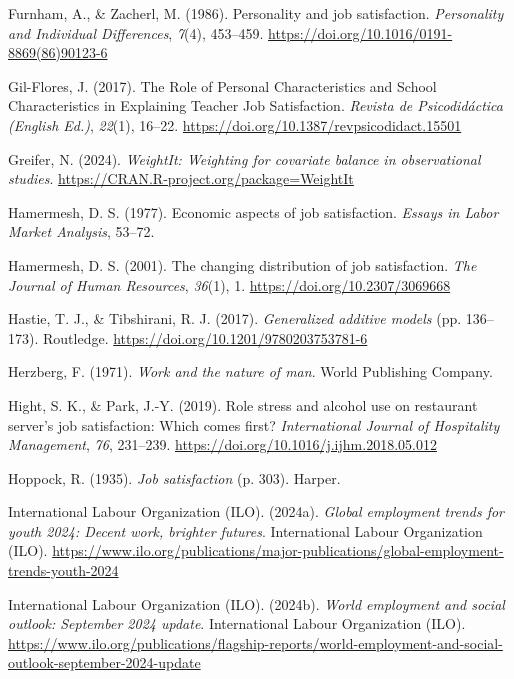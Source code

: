 \documentclass[
]{interact}
\newlength{\cslhangindent}
\newenvironment{CSLReferences}[2] %
 {\begin{list}{}{%
  \setlength{\itemindent}{0pt}
  \setlength{\leftmargin}{0pt}
  \setlength{\parsep}{0pt}
  \ifodd #1
   \setlength{\leftmargin}{\cslhangindent}
   \setlength{\itemindent}{-1\cslhangindent}
  \fi
  \setlength{\itemsep}{#2\baselineskip}}}
 {\end{list}}
\begin{document}
\begin{CSLReferences}{1}{0}
Furnham, A., \& Zacherl, M. (1986). Personality and job satisfaction.
\emph{Personality and Individual Differences}, \emph{7}(4), 453--459.
\url{https://doi.org/10.1016/0191-8869(86)90123-6}

Gil-Flores, J. (2017). The Role of Personal Characteristics and School
Characteristics in Explaining Teacher Job Satisfaction. \emph{Revista de
Psicodidáctica (English Ed.)}, \emph{22}(1), 16--22.
\url{https://doi.org/10.1387/revpsicodidact.15501}

Greifer, N. (2024). \emph{WeightIt: Weighting for covariate balance in
observational studies}.
\url{https://CRAN.R-project.org/package=WeightIt}

Hamermesh, D. S. (1977). Economic aspects of job satisfaction.
\emph{Essays in Labor Market Analysis}, 53--72.

Hamermesh, D. S. (2001). The changing distribution of job satisfaction.
\emph{The Journal of Human Resources}, \emph{36}(1), 1.
\url{https://doi.org/10.2307/3069668}

Hastie, T. J., \& Tibshirani, R. J. (2017). \emph{Generalized additive
models} (pp. 136--173). Routledge.
\url{https://doi.org/10.1201/9780203753781-6}

Herzberg, F. (1971). \emph{Work and the nature of man}. World Publishing
Company.

Hight, S. K., \& Park, J.-Y. (2019). Role stress and alcohol use on
restaurant server{'}s job satisfaction: Which comes first?
\emph{International Journal of Hospitality Management}, \emph{76},
231--239. \url{https://doi.org/10.1016/j.ijhm.2018.05.012}

Hoppock, R. (1935). \emph{Job satisfaction} (p. 303). Harper.

International Labour Organization (ILO). (2024a). \emph{Global
employment trends for youth 2024: Decent work, brighter futures}.
International Labour Organization (ILO).
\url{https://www.ilo.org/publications/major-publications/global-employment-trends-youth-2024}

International Labour Organization (ILO). (2024b). \emph{World employment
and social outlook: September 2024 update}. International Labour
Organization (ILO).
\url{https://www.ilo.org/publications/flagship-reports/world-employment-and-social-outlook-september-2024-update}


\end{CSLReferences}
\end{document}
